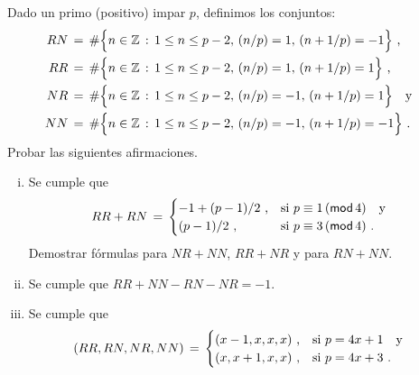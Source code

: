 \begin{ejerResiduos}\label{ejer:residuos:gauss}
	Dado un primo (positivo) impar $p$, definimos los conjuntos:
	\begin{displaymath}
		\begin{aligned}
			RN & \,=\,
				\cardinal{\Big\{ n\in\Enteros\,:\,1\leq n\leq p-2,\,\tlegendre n p=1,\,\tlegendre{n+1} p=-1\Big\}}
				\dispcomma \\
			RR & \,=\,
				\cardinal{\Big\{ n\in\Enteros\,:\,1\leq n\leq p-2,\,\tlegendre n p=1,\,\tlegendre{n+1} p=1\Big\}}
				\dispcomma \\
			NR & \,=\,
				\cardinal{\Big\{ n\in\Enteros\,:\,1\leq n\leq p-2,\,\tlegendre n p=-1,\,\tlegendre{n+1} p=1\Big\}}
				\dispand \\
			NN & \,=\,
				\cardinal{\Big\{ n\in\Enteros\,:\,1\leq n\leq p-2,\,\tlegendre n p=-1,\,\tlegendre{n+1} p=-1\Big\}}
				\dispstop
		\end{aligned}
	\end{displaymath}
	Probar las siguientes afirmaciones.
	\begin{enumerate}[(i)]
		\item\label{item:residuos:gauss:i}
			Se cumple que
			\begin{displaymath}
				RR+RN\,=\,
					\begin{cases}
						-1+(p-1)/2\dispcomma &
							\text{si }
							p\equiv 1\tmodulo[4]
							\dispand \\
						(p-1)/2\dispcomma &
							\text{si }
							p\equiv 3\tmodulo[4]
							\dispstop
					\end{cases}
			\end{displaymath}
			Demostrar f\'ormulas para
			$NR+NN$, $RR+NR$ y para $RN+NN$.
		\item\label{item:residuos:gauss:ii}
			Se cumple que
			$RR+NN-RN-NR=-1$.
		\item\label{item:residuos:gauss:iii}
			Se cumple que
			\begin{displaymath}
				(RR,RN,NR,NN)\,=\,
					\begin{cases}
						(x-1,x,x,x)\dispcomma &
							\text{si }
							p=4x+1\dispand \\
						(x,x+1,x,x)\dispcomma &
							\text{si }
							p=4x+3\dispstop
					\end{cases}
			\end{displaymath}
	\end{enumerate}
\end{ejerResiduos}

